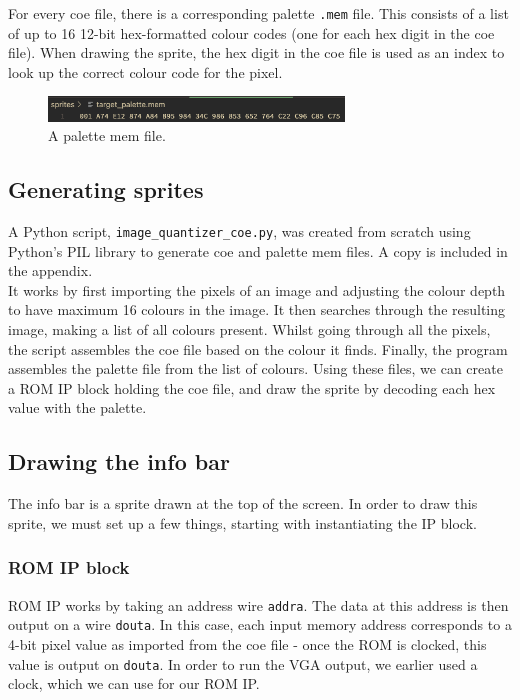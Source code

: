 \documentclass{ifda}
\begin{document}
For every coe file, there is a corresponding palette \verb|.mem| file. This consists of a list of up to 16 12-bit hex-formatted colour codes (one for each hex digit in the coe file). When drawing the sprite, the hex digit in the coe file is used as an index to look up the correct colour code for the pixel.\\

\begin{figure}[h]
    \centering
    \includegraphics[width=0.7\textwidth]{ targetpalette }
    \caption{A palette mem file.}
    \label{fig:sync_assignment}
\end{figure}

\subsection{Generating sprites}
A Python script, \verb|image_quantizer_coe.py|, was created from scratch using Python's PIL library to generate coe and palette mem files. A copy is included in the appendix.\\

It works by first importing the pixels of an image and adjusting the colour depth to have maximum 16 colours in the image. It then searches through the resulting image, making a list of all colours present. Whilst going through all the pixels, the script assembles the coe file based on the colour it finds. Finally, the program assembles the palette file from the list of colours. Using these files, we can create a ROM IP block holding the coe file, and draw the sprite by decoding each hex value with the palette.\\

\subsection{Drawing the info bar}
The info bar is a sprite drawn at the top of the screen. In order to draw this sprite, we must set up a few things, starting with instantiating the IP block.\\

\subsubsection{ROM IP block}
ROM IP works by taking an address wire \verb|addra|. The data at this address is then output on a wire \verb|douta|. In this case, each input memory address corresponds to a 4-bit pixel value as imported from the coe file - once the ROM is clocked, this value is output on \verb|douta|. In order to run the VGA output, we earlier used a clock, which we can use for our ROM IP.\\
\end{document}
